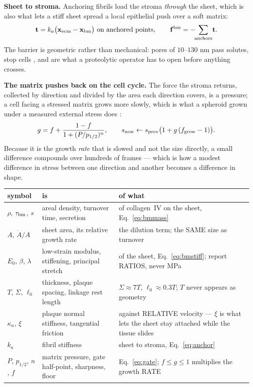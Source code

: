 \documentclass[10pt,a4paper]{article}
\begin{document}
\textbf{Sheet to stroma.} Anchoring fibrils \cite{keene1987} load the stroma \emph{through} the sheet,
which is also what lets a stiff sheet spread a local epithelial push over a soft matrix:
%
\begin{equation}
\mathbf t=k_a\bigl(\mathbf x_{\rm ecm}-\mathbf x_{\rm bm}\bigr)\ \text{on anchored points},
\qquad
\mathbf f^{\rm bm}=-\!\!\sum_{\rm anchors}\!\mathbf t .
\label{eq:anchor}
\end{equation}
%
The barrier is geometric rather than mechanical: pores of $10$--$130$ nm pass solutes, stop cells
\cite{yurchenco2011}, and are what a proteolytic operator has to open before anything crosses.

\textbf{The matrix pushes back on the cell cycle.} The force the stroma returns, collected by direction
and divided by the area each direction covers, is a pressure; a cell facing a stressed matrix grows
more slowly, which is what a spheroid grown under a measured external stress does
\cite{helmlinger1997,montel2011}:
%
\begin{equation}
g=f+\frac{1-f}{1+(P/p_{1/2})^n},
\qquad s_{\rm now}\leftarrow s_{\rm prev}\bigl(1+g\,(f_{\rm grow}-1)\bigr).
\label{eq:gate}
\end{equation}
%
Because it is the growth \emph{rate} that is slowed and not the size directly, a small difference
compounds over hundreds of frames --- which is how a modest difference in stress between one direction
and another becomes a difference in shape.

\smallskip
{\small\begin{tabular}{@{}llp{8.4cm}@{}}\toprule
symbol & is & of what\\\midrule
$\rho$, $\tau_{\rm bm}$, $s$ & areal density, turnover time, secretion & of collagen~IV on the sheet,
  Eq.~\eqref{eq:bmmass}\\
$A$, $\dot A/A$ & sheet area, its relative growth rate & the dilution term; the SAME size as turnover\\
$E_0$, $\beta$, $\lambda$ & low-strain modulus, stiffening, principal stretch & of the sheet,
  Eq.~\eqref{eq:bmstiff}; report RATIOS, never MPa\\
$T$, $\Sigma$, $\ell_0$ & thickness, plaque spacing, linkage rest length & $\Sigma\approx7T$,
  $\ell_0\approx0.3T$; $T$ never appears as geometry\\
$\kappa_n$, $\xi$ & plaque normal stiffness, tangential friction & against RELATIVE velocity ---
  $\xi$ is what lets the sheet stay attached while the tissue slides\\
$k_a$ & fibril stiffness & sheet to stroma, Eq.~\eqref{eq:anchor}\\
$P$, $p_{1/2}$, $n$, $f$ & matrix pressure, gate half-point, sharpness, floor & Eq.~\eqref{eq:gate};
  $f\le g\le1$ multiplies the growth RATE\\
\bottomrule\end{tabular}}
\end{document}
